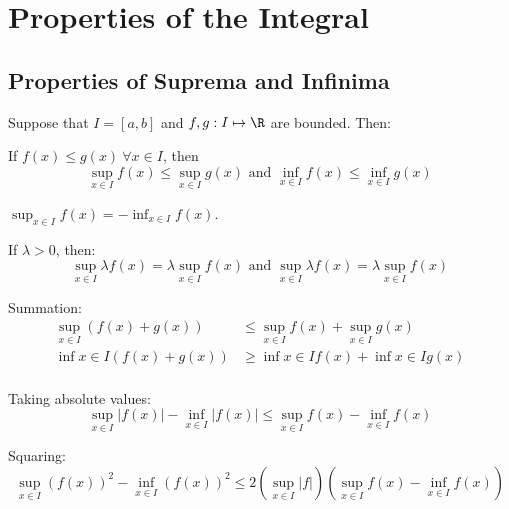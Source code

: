 \documentclass[../Main.tex]{subfiles}
\begin{document}
\section{Properties of the Integral}
\subsection{Properties of Suprema and Infinima}
\begin{propositions}{
        Suppose that $I = [a, b]$ and $f, g : I \mapsto \R$ are bounded. Then:
        \label{propsSupremumProps}
    }   
    \item If $f(x) \leq g(x)~\forall x \in I$, then
        \begin{equation*}
            \sup_{x \in I} f(x) \leq \sup_{x \in I} g(x) \text{ and } \inf_{x \in I} f(x) \leq \inf_{x \in I} g(x)
        \end{equation*}
        \label{propSupPreservesOrdering}
    \item $\sup_{x \in I} f(x) = -\inf_{x \in I} f(x)$. \label{propSupOfNegative}
    \item If $\lambda > 0$, then:
        \begin{equation*}
            \sup_{x \in I} \lambda f(x) = \lambda \sup_{x \in I} f(x) \text{ and } \sup_{x \in I} \lambda f(x) = \lambda \sup_{x \in I} f(x)
        \end{equation*}
        \label{propSupConstant}
    \item Summation:
        \begin{align*}
            \sup_{x \in I} (f(x) + g(x)) &\leq \sup_{x \in I} f(x) + \sup_{x \in I} g(x) \\
            \inf{x \in I} (f(x) + g(x)) &\geq \inf{x \in I} f(x) + \inf{x \in I} g(x) \\
        \end{align*}
        \label{propSupSum}
    \item Taking absolute values:
        \begin{equation*}
            \sup_{x \in I} |f(x)| - \inf_{x \in I} |f(x)| \leq \sup_{x \in I} f(x) - \inf_{x \in I} f(x)
        \end{equation*}
        \label{propSupAbs}
    \item Squaring:
        \begin{equation*}
            \sup_{x \in I} (f(x))^2 - \inf_{x \in I} (f(x))^2 \leq 2 \left(\sup_{x \in I} |f|\right) \left(\sup_{x \in I} f(x) - \inf_{x \in I} f(x) \right)
        \end{equation*}
        \label{propSupSquare}
\end{propositions}
\end{document}
